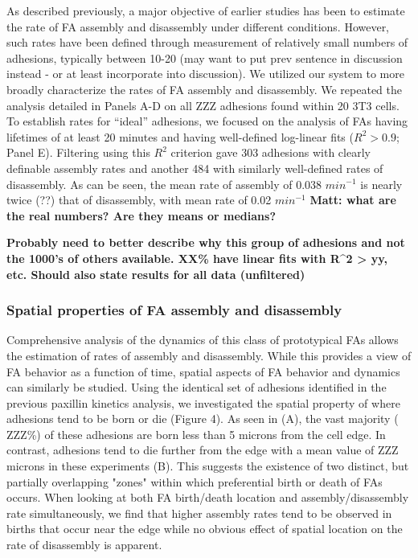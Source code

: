 \documentclass[10pt]{article}
\begin{document}
As described previously, a major objective of earlier studies has been to estimate the rate of FA assembly and disassembly under different conditions. However, such rates have been defined through measurement of relatively small numbers of adhesions, typically between 10-20 (may want to put prev sentence in discussion instead - or at least incorporate into discussion). We utilized our system to more broadly characterize the rates of FA assembly and disassembly. We repeated the analysis detailed in Panels A-D on all ZZZ adhesions found within 20 3T3 cells. To establish rates for ``ideal'' adhesions, we focused on the analysis of FAs having lifetimes of at least 20 minutes and having well-defined log-linear fits ($R^2 > 0.9$; Panel E). Filtering using this $R^2$ criterion gave 303 adhesions with clearly definable assembly rates and another 484 with similarly well-defined rates of disassembly. As can be seen, the mean rate of assembly of 0.038 $min^{-1}$ is nearly twice (??) that of disassembly, with mean rate of 0.02 $min^{-1}$ \textbf{Matt: what are the real numbers? Are they means or medians?} 

\textbf{Probably need to better describe why this group of adhesions and not the 1000's of others available. XX\% have linear fits with R^2 > yy, etc. Should also state results for all data (unfiltered)} 

\subsubsection*{Spatial properties of FA assembly and disassembly}
Comprehensive analysis of the dynamics of this class of prototypical FAs allows the estimation of rates of assembly and disassembly. While this provides a view of FA behavior as a function of time, spatial aspects of FA behavior and dynamics can similarly be studied. Using the identical set of adhesions identified in the previous paxillin kinetics analysis, we investigated the spatial property of where adhesions tend to be born or die (Figure 4). As seen in (A), the vast majority (~ ZZZ\%) of these adhesions are born less than 5 microns from the cell edge. In contrast, adhesions tend to die further from the edge with a mean value of ZZZ microns in these experiments (B). This suggests the existence of two distinct, but partially overlapping "zones" within which preferential birth or death of FAs occurs. When looking at both FA birth/death location and assembly/disassembly rate simultaneously, we find that higher assembly rates tend to be observed in births that occur near the edge while no obvious effect of spatial location on the rate of disassembly is apparent. 
\end{document}
